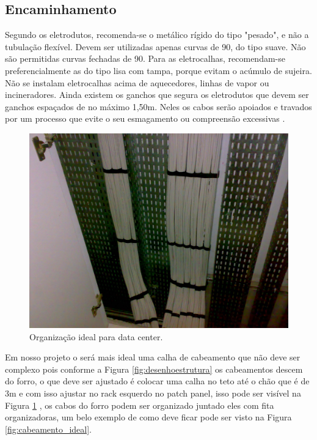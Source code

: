 \documentclass[	DIV=calc,%
							paper=a4,%
							fontsize=12pt,%
							onecolumn]{scrartcl}	 					%
\begin{document}
\subsection{Encaminhamento}
Segundo \cite{pinheiro2015} os eletrodutos, recomenda-se o metálico rígido do tipo "pesado", e não a tubulação flexível. Devem ser utilizadas apenas curvas de 90\textdegree, do tipo suave. Não são permitidas curvas fechadas de 90\textdegree. Para as eletrocalhas, recomendam-se preferencialmente as do tipo lisa com tampa, porque evitam o acúmulo de sujeira. Não se instalam eletrocalhas acima de aquecedores, linhas de vapor ou incineradores. Ainda existem os ganchos que segura os eletrodutos que devem ser ganchos espaçados de no máximo 1,50m. Neles os cabos serão apoiados e travados por um processo que evite o seu esmagamento ou compreensão excessivas \cite{pinheiro2015}. 

\begin{figure}[!htbp]
	\centering
	\includegraphics[width=\textwidth]{./imagens/organizacao_ideal.png}
	\caption{Organização ideal para data center.}
	\label{fig:cabeamento_ideal_datacenter}
\end{figure}

Em nosso projeto o será mais ideal uma calha de cabeamento que não deve ser complexo pois conforme a Figura \ref{fig:desenhoestrutura} os cabeamentos descem do forro, o que deve ser ajustado é colocar uma calha no teto até o chão que é de 3m e com isso ajustar no rack esquerdo no patch panel, isso pode ser visível na Figura \ref{fig:cabeamento_ideal_datacenter} , os cabos do forro podem ser organizado juntado eles com fita organizadoras, um belo exemplo de como deve ficar pode ser visto na Figura \ref{fig:cabeamento_ideal}.
 
\end{document}
